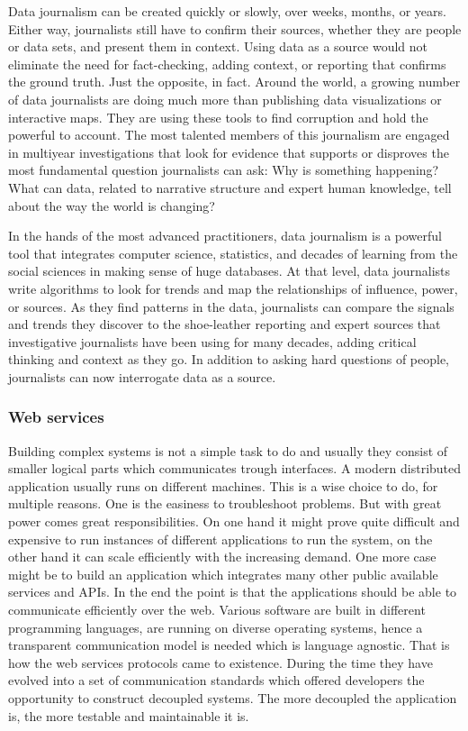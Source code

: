 Data journalism can be created quickly or slowly, over weeks, months, or years. Either way, journalists still have to confirm their sources, whether they are people or data sets, and present them in context. Using data as a source would not eliminate the need for fact-checking, adding context, or reporting that confirms the ground truth. Just the opposite, in fact. Around the world, a growing number of data journalists are doing much more than publishing data visualizations or interactive maps. They are using these tools to find corruption and hold the powerful to account. The most talented members of this journalism are engaged in multiyear investigations that look for evidence that supports or disproves the most fundamental question journalists can ask: Why is something happening? What can data, related to narrative structure and expert human knowledge, tell about the way the world is changing?

In the hands of the most advanced practitioners, data journalism is a powerful tool that integrates computer science, statistics, and decades of learning from the social sciences in making sense of huge databases. At that level, data journalists write algorithms to look for trends and map the relationships of influence, power, or sources. As they find patterns in the data, journalists can compare the signals and trends they discover to the shoe-leather reporting and expert sources that investigative journalists have been using for many decades, adding critical thinking and context as they go. In addition to asking hard questions of people, journalists can now interrogate data as a source.

\subsubsection{Web services}
Building complex systems is not a simple task to do and usually they consist of smaller logical parts which communicates trough interfaces. A modern distributed application usually runs on different machines. This is a wise choice to do, for multiple reasons. One is the easiness to troubleshoot problems. But with great power comes great responsibilities. On one hand it might prove quite difficult and expensive to run instances of different applications to run the system, on the other hand it can scale efficiently with the increasing demand. One more case might be to build an application which integrates many other public available services and APIs. In the end the point is that the applications should be able to communicate efficiently over the web. Various software are built in different programming languages, are running on diverse operating systems, hence a transparent communication model is needed which is language agnostic. That is how the web services protocols came to existence. During the time they have evolved into a set of communication standards which offered developers the opportunity to construct decoupled systems. The more decoupled the application is, the more testable and maintainable it is.

